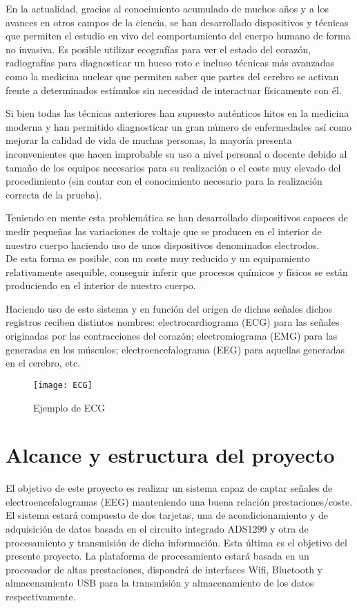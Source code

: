 En la actualidad, gracias al conocimiento acumulado de muchos años y a los avances en otros campos de la ciencia, se han desarrollado dispositivos y técnicas que permiten el estudio en vivo del comportamiento del cuerpo humano de forma no invasiva. Es posible utilizar ecografías para ver el estado del corazón, radiografías para diagnosticar un hueso roto e incluso técnicas más avanzadas como la medicina nuclear que permiten saber que partes del cerebro se activan frente a determinados estímulos sin necesidad de interactuar físicamente con él.

Si bien todas las técnicas anteriores han supuesto auténticos hitos en la medicina moderna y han permitido diagnosticar un gran número de enfermedades así como mejorar la calidad de vida de muchas personas, la mayoría presenta inconvenientes que hacen improbable su uso a nivel personal o docente debido al tamaño de los equipos necesarios para su realización o el coste muy elevado del procedimiento (sin contar con el conocimiento necesario para la realización correcta de la prueba).

Teniendo en mente esta problemática se han desarrollado dispositivos capaces de medir pequeñas las variaciones de voltaje que se producen en el interior de nuestro cuerpo haciendo uso de unos dispositivos denominados electrodos.
\\De esta forma es posible, con un coste muy reducido y un equipamiento relativamente asequible, conseguir inferir que procesos químicos y físicos se están produciendo en el interior de nuestro cuerpo.

Haciendo uso de este sistema y en función del origen de dichas señales dichos registros reciben distintos nombres: electrocardiograma (ECG) para las señales originadas por las contracciones del corazón; electromiograma (EMG) para las generadas en los músculos; electroencefalograma (EEG) para aquellas generadas en el cerebro, etc.

\begin{figure} [H] %
    \centering
    \texttt{[image: ECG]}
    \caption{Ejemplo de ECG}
    \label{fig:ECG}
\end{figure}

\section{Alcance y estructura del proyecto}
El objetivo de este proyecto es realizar un sistema capaz de captar señales de electroencefalogramas (EEG) manteniendo una buena relación prestaciones/coste. El sistema estará compuesto de dos tarjetas, una de acondicionamiento y de adquisición de datos basada en el circuito integrado ADS1299 y otra de procesamiento y transmisión de dicha información. Esta última es el objetivo del presente proyecto. La plataforma de procesamiento estará basada en un procesador de altas prestaciones, dispondrá de interfaces Wifi, Bluetooth y almacenamiento USB para la transmisión y almacenamiento de los datos respectivamente. 


